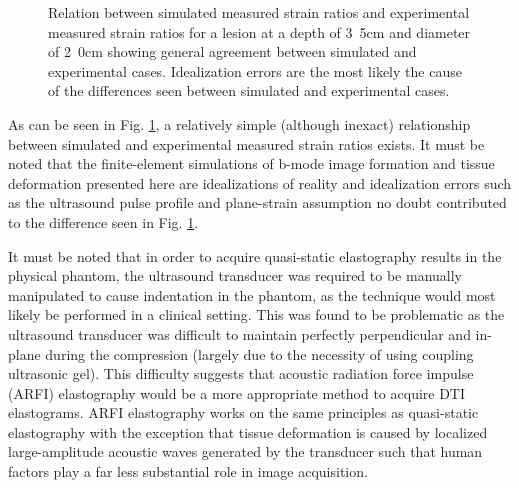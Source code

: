 			\begin{figure}[!t]
				\centering
				\caption{Relation between simulated measured strain ratios and experimental measured strain ratios for a lesion at a depth of \unit{3.5}{cm} and diameter of \unit{2.0}{cm} showing general agreement between simulated and experimental cases. Idealization errors are the most likely the cause of the differences seen between simulated and experimental cases.}
				\label{fig:phantom_validation}
			\end{figure}

			As can be seen in Fig. \ref{fig:phantom_validation}, a relatively simple (although inexact) relationship between simulated and experimental measured strain ratios exists. It must be noted that the finite-element simulations of b-mode image formation and tissue deformation presented here are idealizations of reality and idealization errors such as the ultrasound pulse profile and plane-strain assumption no doubt contributed to the difference seen in Fig. \ref{fig:phantom_validation}.

			It must be noted that in order to acquire quasi-static elastography results in the physical phantom, the ultrasound transducer was required to be manually manipulated to cause indentation in the phantom, as the technique would most likely be performed in a clinical setting. This was found to be problematic as the ultrasound transducer was difficult to maintain perfectly perpendicular and in-plane during the compression (largely due to the necessity of using coupling ultrasonic gel). This difficulty suggests that acoustic radiation force impulse (ARFI) elastography would be a more appropriate method to acquire DTI elastograms. ARFI elastography works on the same principles as quasi-static elastography with the exception that tissue deformation is caused by localized large-amplitude acoustic waves generated by the transducer such that human factors play a far less substantial role in image acquisition.

	\cleardoublepage


	
	
